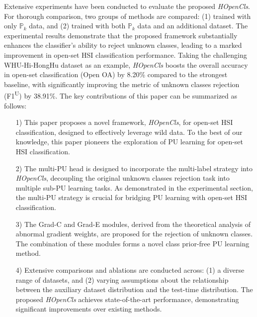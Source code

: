 Extensive experiments have been conducted to evaluate the proposed \textit{HOpenCls}. For thorough comparison, two groups of methods are compared: (1) trained with only $\mathbb{P}_{k}$ data, and (2) trained with both $\mathbb{P}_{k}$ data and an additional dataset. The experimental results demonstrate that the proposed framework substantially enhances the classifier's ability to reject unknown classes, leading to a marked improvement in open-set HSI classification performance. Taking the challenging WHU-Hi-HongHu dataset as an example, \textit{HOpenCls} boosts the overall accuracy in open-set classification (Open OA) by 8.20\% compared to the strongest baseline, with significantly improving the metric of unknown classes rejection (F1\textsuperscript{U}) by 38.91\%. The key contributions of this paper can be summarized as follows:
\begin{itemize}
    \item[1)] This paper proposes a novel framework, \textit{HOpenCls}, for open-set HSI classification, designed to effectively leverage wild data. To the best of our knowledge, this paper pioneers the exploration of PU learning for open-set HSI classification.
    \item[2)] The multi-PU head is designed to incorporate the multi-label strategy into \textit{HOpenCls}, decoupling the original unknown classes rejection task into multiple sub-PU learning tasks. As demonstrated in the experimental section, the multi-PU strategy is crucial for bridging PU learning with open-set HSI classification.
    \item[3)] The Grad-C and Grad-E modules, derived from the theoretical analysis of abnormal gradient weights, are proposed for the rejection of unknown classes. The combination of these modules forms a novel class prior-free PU learning method.
    \item[4)] Extensive comparisons and ablations are conducted across: (1) a diverse range of datasets, and (2) varying assumptions about the relationship between the auxiliary dataset distribution and the test-time distribution. The proposed \textit{HOpenCls} achieves state-of-the-art performance, demonstrating significant improvements over existing methods.
\end{itemize}